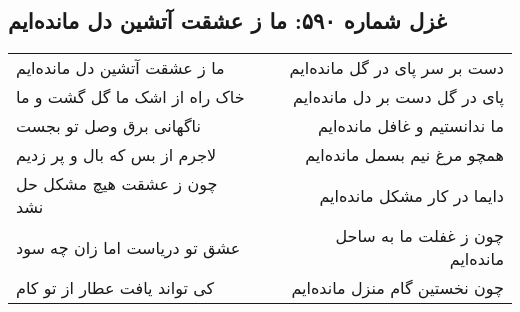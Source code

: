 \begin{center}
\section*{غزل شماره ۵۹۰: ما ز عشقت آتشین دل مانده‌ایم}
\label{sec:590}
\begin{longtable}{l p{0.5cm} r}
ما ز عشقت آتشین دل مانده‌ایم
&&
دست بر سر پای در گل مانده‌ایم
\\
خاک راه از اشک ما گل گشت و ما
&&
پای در گل دست بر دل مانده‌ایم
\\
ناگهانی برق وصل تو بجست
&&
ما ندانستیم و غافل مانده‌ایم
\\
لاجرم از بس که بال و پر زدیم
&&
همچو مرغ نیم بسمل مانده‌ایم
\\
چون ز عشقت هیچ مشکل حل نشد
&&
دایما در کار مشکل مانده‌ایم
\\
عشق تو دریاست اما زان چه سود
&&
چون ز غفلت ما به ساحل مانده‌ایم
\\
کی تواند یافت عطار از تو کام
&&
چون نخستین گام منزل مانده‌ایم
\\
\end{longtable}
\end{center}
